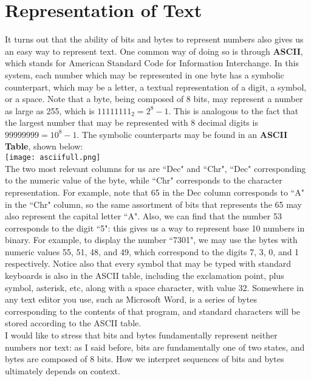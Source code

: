 \documentclass{article}
\begin{document}
\section*{Representation of Text}
It turns out that the ability of bits and bytes to represent numbers also gives us an easy way to represent text. One
common way of doing so is through \textbf{ASCII}, which stands for American Standard Code for Information Interchange.
In this system, each number which may be represented in one byte has a symbolic counterpart, which may be a letter,
a textual representation of a digit, a symbol, or a space. Note that a byte, being composed of 8 bits, may represent
a number as large as 255, which is $11111111_2 = 2^8 - 1$. This is analogous to the fact that the largest number that may be 
represented with 8 decimal digits is $99999999 = 10^8 - 1$. The symbolic counterparts may be found in an 
\textbf{ASCII Table}, shown below: \\

\texttt{[image: asciifull.png]} \\

The two most relevant columns for us are ``Dec" and ``Chr", ``Dec" corresponding to the numeric value of the byte, while
``Chr" corresponds to the character representation. For example, note that 65 in the Dec column corresponds to ``A" in the
``Chr" column, so the same assortment of bits that represents the 65 may also represent the capital letter ``A". Also,
we can find that the number 53 corresponds to the digit ``5": this gives us a way to represent base 10 numbers in binary.
For example, to display the number ``7301", we may use the bytes with numeric values 55, 51, 48, and 49, which correspond
to the digits 7, 3, 0, and 1 respectively. Notice also that every symbol that may be typed with standard keyboards
is also in the ASCII table, including the exclamation point, plus symbol, asterisk, etc, along with a space character,
with value 32. Somewhere in any text editor you use, such as Microsoft Word, is a series of bytes corresponding to the
contents of that program, and standard characters will be stored according to the ASCII table.\\

I would like to stress that bits and bytes fundamentally represent neither numbers nor text: as I said before, bits
are fundamentally one of two states, and bytes are composed of 8 bits. How we interpret sequences of bits and
bytes ultimately depends on context.
\end{document}
